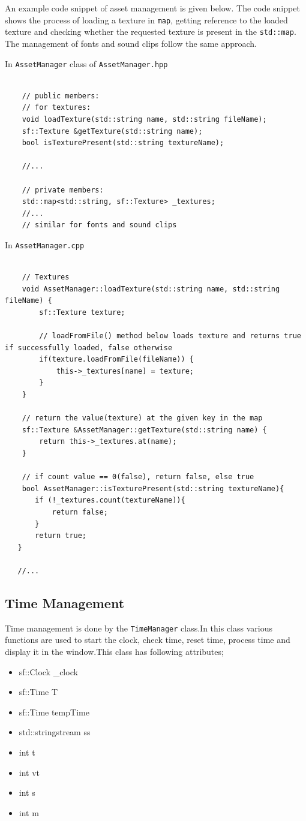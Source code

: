 \documentclass[main]{subfiles}
\begin{document}
     An example code snippet of asset management is given below. The code snippet shows the process of loading a texture in \texttt{map}, getting reference to the loaded texture and checking whether the requested texture is present in the \texttt{std::map}. The management of fonts and sound clips follow the same approach.
     
     In \texttt{AssetManager} class of \texttt{AssetManager.hpp}
    \begin{verbatim}
    
    // public members:
    // for textures:
    void loadTexture(std::string name, std::string fileName);
    sf::Texture &getTexture(std::string name);
    bool isTexturePresent(std::string textureName);

    //...
    
    // private members:
    std::map<std::string, sf::Texture> _textures;
    //...
    // similar for fonts and sound clips

\end{verbatim}



In \texttt{AssetManager.cpp}
    \begin{verbatim}
    
    // Textures
    void AssetManager::loadTexture(std::string name, std::string fileName) {
        sf::Texture texture;

        // loadFromFile() method below loads texture and returns true if successfully loaded, false otherwise
        if(texture.loadFromFile(fileName)) {
            this->_textures[name] = texture;
        }
    }
    
    // return the value(texture) at the given key in the map
    sf::Texture &AssetManager::getTexture(std::string name) {
        return this->_textures.at(name);
    }
    
    // if count value == 0(false), return false, else true
    bool AssetManager::isTexturePresent(std::string textureName){
       if (!_textures.count(textureName)){  
           return false;
       }
       return true;
   }
   
   //...
\end{verbatim}

\subsection{Time Management}
Time management is done by the \texttt{TimeManager} class.In this class various functions are used to start the clock, check time, reset time, process time and display it in the window.This class has following attributes;
\begin{itemize}
\item sf::Clock \_clock
\item sf::Time T
\item sf::Time tempTime
\item std::stringstream ss
\item int t
\item int vt
\item int s
\item int m
\end{itemize}
\end{document}
